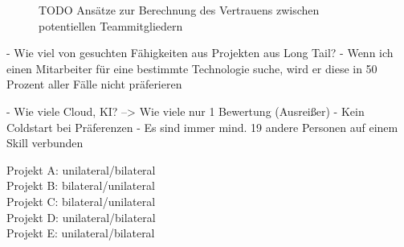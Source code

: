 \begin{figure}[h]
	\newline
	
	\caption{TODO Ansätze zur Berechnung des Vertrauens zwischen potentiellen Teammitgliedern \cite[S. 5]{malinowski:2005}}
	\label{fig:ergebnisse:analyse:abb6}
\end{figure}


\newpage

- Wie viel von gesuchten Fähigkeiten aus Projekten aus Long Tail?
- Wenn ich einen Mitarbeiter für eine bestimmte Technologie suche, wird er diese in 50 Prozent aller Fälle nicht präferieren

- Wie viele Cloud, KI? --> Wie viele nur 1 Bewertung (Ausreißer)
- Kein Coldstart bei Präferenzen
- Es sind immer mind. 19 andere Personen auf einem Skill verbunden

Projekt A: unilateral/bilateral\\
Projekt B: bilateral/unilateral\\
Projekt C: bilateral/unilateral\\
Projekt D: unilateral/bilateral\\
Projekt E: unilateral/bilateral

